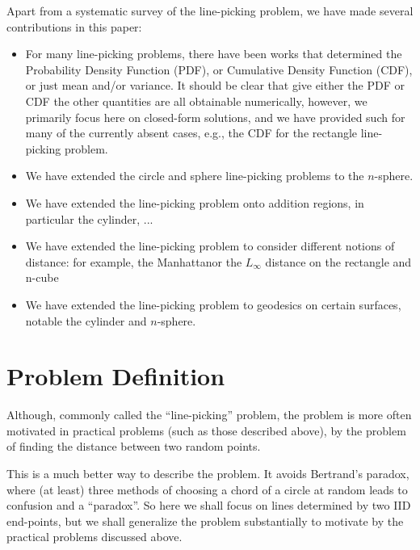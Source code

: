 \documentclass{article}
\begin{document}
Apart from a systematic survey of the line-picking problem, we have
made several contributions in this paper:
\begin{itemize}

\item For many line-picking problems, there have been works that
  determined the Probability Density Function (PDF), or Cumulative
  Density Function (CDF), or just mean and/or variance. It should be
  clear that give either the PDF or CDF the other quantities are all
  obtainable numerically, however, we primarily focus here on
  closed-form solutions, and we have provided such for many of the
  currently absent cases, e.g., the CDF for the rectangle line-picking
  problem. 

\item We have extended the circle and sphere line-picking problems to
  the $n$-sphere.

\item We have extended the line-picking problem onto addition regions,
  in particular the cylinder, ...

\item We have extended the line-picking problem to consider different
  notions of distance: for example, the Manhattanor the $L_{\infty}$
  distance on the rectangle and n-cube

\item We have extended the line-picking problem to geodesics on
  certain surfaces, notable the cylinder and $n$-sphere.

\end{itemize}



\section{Problem Definition}

Although, commonly called the ``line-picking'' problem, the problem is
more often motivated in practical problems (such as those described
above), by the problem of finding the distance between two random
points. 

This is a much better way to describe the problem. It avoids
Bertrand's paradox, where (at least) three methods of choosing a chord
of a circle at random leads to confusion and a ``paradox''.
So here we shall focus on lines determined by two IID end-points, but
we shall generalize the problem substantially to motivate by the
practical problems discussed above.
\end{document}
